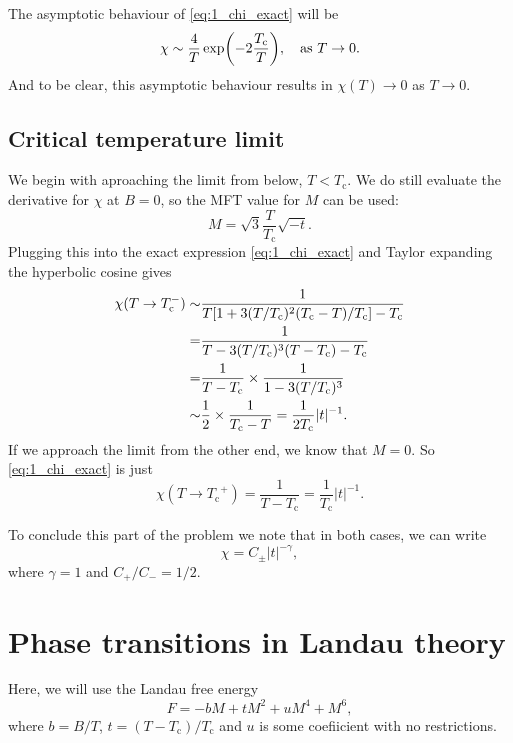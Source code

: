 \documentclass[11pt,letter, swedish, english
]{article}
\newcommand{\Tc}{\ensuremath{T_{\text{c}}}}
\begin{document}
The asymptotic behaviour of \eqref{eq:1_chi_exact} will be 
\begin{equation}
\chi\sim \frac{4}{T}\exp(-2\frac{\Tc}{T})
\qcomma \text{as}\ T\to0.
\end{equation}
And to be clear, this asymptotic behaviour results in $\chi(T)\to0$ as
$T\to0$. 


\subsection{Critical temperature limit}
We begin with aproaching the limit from below, $T<\Tc$. We do still
evaluate the derivative for $\chi$ at $B=0$, so the MFT value for $M$
can be used:
\begin{equation}
M=\sqrt{3}\frac{T}{\Tc}\sqrt{-t}.
\end{equation}
Plugging this into the exact expression \eqref{eq:1_chi_exact} and
Taylor expanding the hyperbolic cosine gives
\begin{equation}
\begin{aligned}
\chi(T\to\Tc^-)\sim&\frac{1}{T\qty[1+3(T/\Tc)^2(\Tc-T)/\Tc]-\Tc}\\
=&\frac{1}{T-3(T/\Tc)^3(T-\Tc) -\Tc}\\
=&\frac{1}{T-\Tc}\times\frac{1}{1-3(T/\Tc)^3}\\
\sim&\frac{1}{2}\times\frac{1}{\Tc-T}=\frac{1}{2\Tc}|t|^{-1}.
\end{aligned}
\end{equation}
If we approach the limit from the other end, we know that $M=0$. So
\eqref{eq:1_chi_exact} is just
\begin{equation}
\chi(T\to\Tc^+)=\frac{1}{T-\Tc}=\frac{1}{\Tc} |t|^{-1}.
\end{equation}

To conclude this part of the problem we note that in both cases, we
can write
\begin{equation}
\chi=C_\pm |t|^{-\gamma},
\end{equation}
where $\gamma=1$ and $C_+/C_-=1/2$.



\section{Phase transitions in Landau theory}
\renewcommand{\thesubsection}{\arabic{section} (\alph{subsection})}
\renewcommand{\thesubsubsection}{\arabic{section} (\alph{subsection},\,\roman{subsubsection})}

Here, we will use the Landau free energy
\begin{equation}\label{eq:2_F(M)}
F=-bM+tM^2+uM^4+M^6,
\end{equation}
where $b=B/T$, $t=(T-\Tc)/\Tc$ and $u$ is some coefiicient with no
restrictions. 
\end{document}
